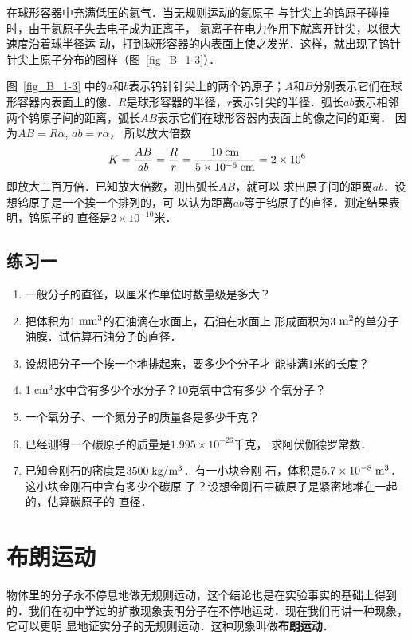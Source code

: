     在球形容器中充满低压的氦气．当无规则运动的氦原子
与针尖上的钨原子碰撞时，由于氦原子失去电子成为正离子，
氦离子在电力作用下就离开针尖，以很大速度沿着球半径运
动，打到球形容器的内表面上使之发光．这样，就出现了钨针
针尖上原子分布的图样（图~\ref{fig_B_1-3}）．


图~\ref{fig_B_1-3} 中的$a$和$b$表示钨针针尖上的两个钨原子；$A$和$B$分别表示它们在球形容器内表面上的像．$R$是球形容器的半径，$r$表示针尖的半径．弧长$ab$表示相邻两个钨原子间的距离，弧长$AB$表示它们在球形容器内表面上的像之间的距离．
因为$AB=R\alpha$, $ab=r\alpha$，
所以放大倍数
\[K=\frac{AB}{ab}=\frac{R}{r}=\frac{10 \;\text{cm} }{5\times 10^{-6} \;\text{cm} }=2\times 10^6 \]
即放大二百万倍．已知放大倍数，测出弧长$AB$，就可以
求出原子间的距离$ab$．设想钨原子是一个挨一个排列的，可
以认为距离$ab$等于钨原子的直径．测定结果表明，钨原子的
直径是$2\times 10^{-10}$米．


\subsection*{练习一}
\begin{enumerate}
\item  一般分子的直径，以厘米作单位时数量级是多大？
\item  把体积为1$\;\text{mm}^3$的石油滴在水面上，石油在水面上
形成面积为3$\;\text{m}^2$的单分子油膜．试估算石油分子的直径．
\item  设想把分子一个挨一个地排起来，要多少个分子才
能排满1米的长度？
\item  1$\;\text{cm}^3$水中含有多少个水分子？10克氧中含有多少
个氧分子？
\item  一个氧分子、一个氮分子的质量各是多少千克？
\item  已经测得一个碳原子的质量是$1.995\times 10^{-26}$千克，
求阿伏伽德罗常数．
\item  已知金刚石的密度是$3500 \;\text{kg}/\text{m}^3$．有一小块金刚
石，体积是$5.7\times 10^{-8} \;\text{m}^3 $．这小块金刚石中含有多少个碳原
子？设想金刚石中碳原子是紧密地堆在一起的，估算碳原子的
直径．

\end{enumerate}







\section{布朗运动}
物体里的分子永不停息地做无规则运动，这个结论也是在实验事实的基础上得到的．我们在初中学过的扩散现象表明分子在不停地运动．现在我们再讲一种现象，它可以更明
显地证实分子的无规则运动．这种现象叫做\textbf{布朗运动}．

